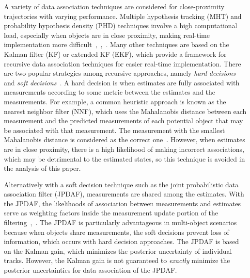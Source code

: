 \documentclass[letterpaper, 10pt, conference]{ieeeconf}
\begin{document}
A variety of data association techniques are considered for close-proximity trajectories with varying performance.
Multiple hypothesis tracking (MHT) and probability hypothesis density (PHD) techniques involve a high computational load, especially when objects are in close proximity, making real-time implementation more difficult~\cite{MHT1},~\cite{PHD1},~\cite{PHD2}.
Many other techniques are based on the Kalman filter (KF) or extended KF (EKF), which provide a framework for recursive data association techniques for easier real-time implementation.
There are two popular strategies among recursive approaches, namely \emph{hard decisions} and \emph{soft decisions}~\cite{JPDAF1}.
A hard decision is when estimates are fully associated with measurements according to some metric between the estimates and the measurements.
For example, a common heuristic approach is known as the nearest neighbor filter (NNF), which uses the Mahalanobis distance between each measurement and the predicted measurements of each potential object that may be associated with that measurement.
The measurement with the smallest Mahalanobis distance is considered as the correct one~\cite{NN2}.
However, when estimates are in close proximity, there is a high likelihood of making incorrect associations, which may be detrimental to the estimated states, so this technique is avoided in the analysis of this paper.

Alternatively with a soft decision technique such as the joint probabilistic data association filter (JPDAF), measurements are shared among the estimates. With the JPDAF, the likelihoods of association between measurements and estimates serve as weighting factors inside the measurement update portion of the filtering~\cite{JPDAF1},~\cite{TrackDataAssoc}.
The JPDAF is particularly advantageous in multi-object scenarios because when objects share measurements, the soft decisions prevent loss of information, which occurs with hard decision approaches.
The JPDAF is based on the Kalman gain, which minimizes the posterior uncertainty of individual tracks.
However, the Kalman gain is not guaranteed to \emph{exactly} minimize the posterior uncertainties for data association of the JPDAF.
\end{document}
